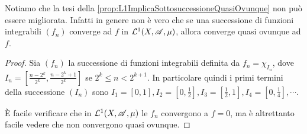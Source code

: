 \begin{remark}
	Notiamo che la tesi della \cref{prop:L1ImplicaSottosuccessioneQuasiOvunque} non può essere migliorata. Infatti in genere non è vero che se una successione di funzioni integrabili $(f_n)$ converge ad $f$ in $\mathcal L^1(X,\mathscr A,\mu)$, allora converge quasi ovunque ad $f$.
\end{remark}
\begin{proof}
	Sia $(f_n)$ la successione di funzioni integrabili definita da $f_n=\chi_{I_n}$, dove $I_n=\left[\frac{n-2^k}{2^k},\frac{n-2^k+1}{2^k}\right]$ se $2^k\le n<2^{k+1}$. In particolare quindi i primi termini della successione $(I_n)$ sono $I_1=\left[0,1\right],I_2=\left[0,\frac 12\right],I_3=\left[\frac 12,1\right],I_4=\left[0,\frac 14\right],\cdots$. 
	
	È facile verificare che in $\mathcal L^1(X,\mathscr A,\mu)$ le $f_n$ convergono a $f=0$, ma è altrettanto facile vedere che non convergono quasi ovunque.

\end{proof}





